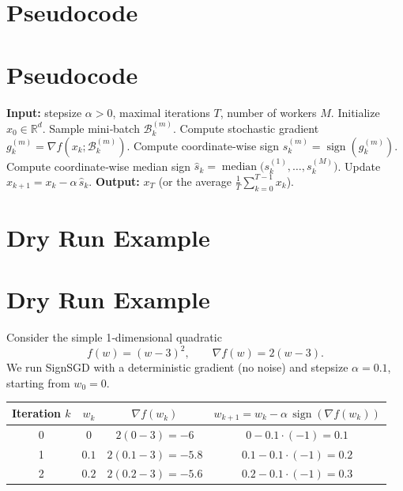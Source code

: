 \documentclass{article}
\newcommand{\sign}{\operatorname{sign}}
\newcommand{\R}{\mathbb{R}}
\begin{document}
\section*{Pseudocode}
\section{Pseudocode}
\begin{algorithm}[H]
\caption{SignSGD with Median Variance Control}
\begin{algorithmic}[1]
\State \textbf{Input:} stepsize $\alpha>0$, maximal iterations $T$,
                number of workers $M$.
\State Initialize $x_0\in\R^{d}$.
        \State Sample mini‑batch $\mathcal{B}_k^{(m)}$.
        \State Compute stochastic gradient $g_k^{(m)}
                =\nabla f(x_k;\mathcal{B}_k^{(m)})$.
        \State Compute coordinate‑wise sign $s_k^{(m)} = \sign(g_k^{(m)})$.
    \EndFor
    \State Compute coordinate‑wise median sign
          $\widehat{s}_k=\operatorname{median}\big(s_k^{(1)},\dots,
          s_k^{(M)}\big)$.
    \State Update $x_{k+1}=x_k-\alpha\,\widehat{s}_k$.
\EndFor
\State \textbf{Output:} $x_T$ (or the average $\frac1T\sum_{k=0}^{T-1}x_k$).
\end{algorithmic}
\end{algorithm}

\section*{Dry Run Example}
\section{Dry Run Example}
Consider the simple 1‑dimensional quadratic
\[
f(w)=(w-3)^2,\qquad \nabla f(w)=2(w-3).
\]
We run SignSGD with a deterministic gradient (no noise) and stepsize
$\alpha=0.1$, starting from $w_0=0$.

\begin{center}
\begin{tabular}{c|c|c|c}
Iteration $k$ & $w_k$ & $\nabla f(w_k)$ & $w_{k+1}=w_k-\alpha\,\sign(\nabla f(w_k))$\\\midrule
0 & $0$ & $2(0-3)=-6$ & $0-0.1\cdot(-1)=0.1$\\
1 & $0.1$ & $2(0.1-3)=-5.8$ & $0.1-0.1\cdot(-1)=0.2$\\
2 & $0.2$ & $2(0.2-3)=-5.6$ & $0.2-0.1\cdot(-1)=0.3$\\
\end{tabular}
\end{center}
\end{document}

